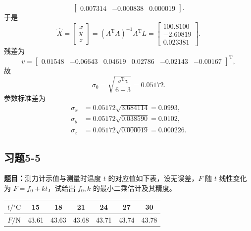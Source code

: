 \documentclass[UTF8,zihao=-4]{ctexart}
\newcommand{\problem}[1]{\subsection*{#1}}
\newcommand{\timu}{\noindent\textbf{题目：}}
\begin{document}
{\begin{equation*}
\begin{bmatrix}
        0.007314&-0.000838&0.000019
    \end{bmatrix}.
\end{equation*}
于是
\begin{equation*}
    \hat{X}=\begin{bmatrix}x\\y\\z\end{bmatrix}
    =(A^{\mathrm T}A)^{-1}A^{\mathrm T}L
    =\begin{bmatrix}
        100.8100\\-2.60819\\0.023381
    \end{bmatrix}.
\end{equation*}
残差为
\begin{equation*}
    v=\begin{bmatrix}
        0.01548&-0.06643&0.04619&0.02786&-0.02143&-0.00167
    \end{bmatrix}^{\mathrm T},
\end{equation*}
故
\begin{equation*}
    \sigma_0=\sqrt{\frac{v^{\mathrm T}v}{6-3}}=0.05172.
\end{equation*}
参数标准差为
\begin{equation*}
\begin{aligned}
    \sigma_x&=0.05172\sqrt{3.684114}=0.0993,\\
    \sigma_y&=0.05172\sqrt{0.038590}=0.0102,\\
    \sigma_z&=0.05172\sqrt{0.000019}=0.000226.
\end{aligned}
\end{equation*}

\problem{习题5-5}
\timu 测力计示值与测量时温度 $t$ 的对应值如下表，设无误差，$F$ 随 $t$ 线性变化为 $F=f_0+kt$，试给出 $f_0,k$ 的最小二乘估计及其精度。

\begin{center}
\small
\begin{tabular}{c|cccccc}
\toprule
$t/{}^\circ\mathrm{C}$ & 15 & 18 & 21 & 24 & 27 & 30\\
\midrule
$F/\mathrm{N}$ & 43.61 & 43.63 & 43.68 & 43.71 & 43.74 & 43.78\\
\bottomrule
\end{tabular}
\end{center}

}
\end{document}
